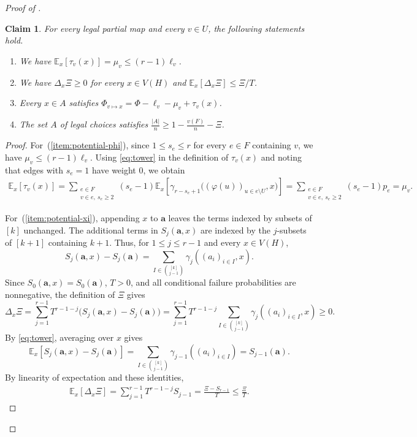 \documentclass[10pt]{article}
\numberwithin{equation}{section}
\newtheorem{claim}[claim]{Claim}
\newcommand{\E}{\mathbb E}
\begin{document}
\begin{proof}[Proof of ]
\begin{claim}\label{clm:potential-updates}
For every legal partial map and every $v\in U$, the following statements hold.
\begin{enumerate}
\renewcommand{\theenumi}{\roman{enumi}}
\renewcommand{\labelenumi}{\textup{(\theenumi)}}
\item\label{item:potential-phi}
We have $\E_x[\tau_v(x)]=\mu_v\le(r-1)\ell_v$.
\item\label{item:potential-xi}
We have $\Delta_x\Xi\ge0$ for every $x\in V(H)$ and $\E_x[\Delta_x\Xi]\le\Xi/T$.
\item\label{item:potential-phi-update}
Every $x\in A$ satisfies $\Phi_{v\mapsto x}=\Phi-\ell_v-\mu_v+\tau_v(x)$.
\item\label{item:legal-choices}
The set $A$ of legal choices satisfies $\frac{|A|}{n}\ge1-\frac{v(F)}n-\Xi$.
\end{enumerate}
\end{claim}

\begin{proof}
For~(\ref{item:potential-phi}), since $1\le s_e\le r$ for every $e\in F$ containing $v$, we have $\mu_v\le(r-1)\ell_v$. Using \eqref{eq:tower} in the definition of $\tau_v(x)$ and noting that edges with $s_e=1$ have weight $0$, we obtain
\[
\begin{aligned}
\E_x[\tau_v(x)]
=\sum_{\substack{e\in F\\v\in e,\ s_e\ge2}}
(s_e-1)\E_x\!\left[
\gamma_{r-s_e+1}\bigl((\varphi(u))_{u\in e\setminus U},x\bigr)
\right]
=\sum_{\substack{e\in F\\v\in e,\ s_e\ge2}}(s_e-1)p_e
=\mu_v.
\end{aligned}
\]

For~(\ref{item:potential-xi}), appending $x$ to $\mathbf a$ leaves the terms indexed by subsets of $[k]$ unchanged. The additional terms in $S_j(\mathbf a,x)$ are indexed by the $j$-subsets of $[k+1]$ containing $k+1$. Thus, for $1\le j\le r-1$ and every $x\in V(H)$,
\[
S_j(\mathbf a,x)-S_j(\mathbf a)
=\sum_{I\in\binom{[k]}{j-1}}\gamma_j((a_i)_{i\in I},x).
\]
Since $S_0(\mathbf a,x)=S_0(\mathbf a)$, $T>0$, and all conditional failure probabilities are nonnegative, the definition of $\Xi$ gives
\[
\Delta_x\Xi
=\sum_{j=1}^{r-1}T^{r-1-j}\bigl(S_j(\mathbf a,x)-S_j(\mathbf a)\bigr)
=\sum_{j=1}^{r-1}T^{r-1-j}
\sum_{I\in\binom{[k]}{j-1}}\gamma_j((a_i)_{i\in I},x)
\ge0.
\]
By \eqref{eq:tower}, averaging over $x$ gives
\[
\E_x[S_j(\mathbf a,x)-S_j(\mathbf a)]
=\sum_{I\in\binom{[k]}{j-1}}\gamma_{j-1}((a_i)_{i\in I})
=S_{j-1}(\mathbf a).
\]
By linearity of expectation and these identities,
\[
\begin{aligned}
\E_x[\Delta_x\Xi]
=\sum_{j=1}^{r-1}T^{r-1-j}S_{j-1}
=\frac{\Xi-S_{r-1}}{T}
\le\frac{\Xi}{T}.
\end{aligned}
\]


\end{proof}
\end{proof}
\end{document}
